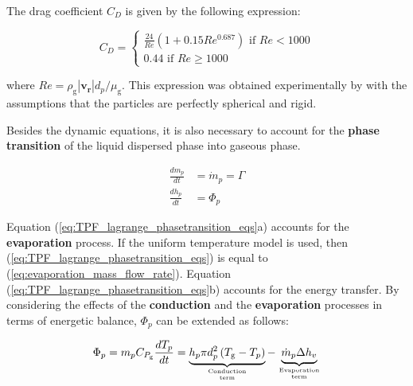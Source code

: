 The drag coefficient $C_D$ is given by the following expression:

\begin{equation}
\label{eq:Re_CD_droplet}
C_D =
\left\{
    \begin{split}
     \frac{24}{Re} \left( 1 + 0.15 Re^{0.687} \right)\,\,\mathrm{if}\,\,Re < 1000 \\ 
    0.44\,\,\mathrm{if}\,\,Re \geq 1000 
    \end{split}
\right.
\end{equation}

where $Re = \rho_\mathrm{g} | \boldsymbol{v_r} | d_p / \mu_\mathrm{g} $. This expression was obtained experimentally by  with the assumptions that the particles are perfectly spherical and rigid.  



Besides the dynamic equations, it is also necessary to account for the \textbf{phase transition} of the liquid dispersed phase into gaseous phase. 

\begin{subequations}
\label{eq:TPF_lagrange_phasetransition_eqs}
\begin{align}
\frac{d m_p}{d t} &= \dot{m}_p = \Gamma \\
\frac{d h_p}{d t} &= \Phi_p
\end{align}
\end{subequations}

Equation (\ref{eq:TPF_lagrange_phasetransition_eqs}a) accounts for the \textbf{evaporation} process. If the uniform temperature model is used, then (\ref{eq:TPF_lagrange_phasetransition_eqs}) is equal to (\ref{eq:evaporation_mass_flow_rate}). Equation (\ref{eq:TPF_lagrange_phasetransition_eqs}b) accounts for the energy transfer. By considering the effects of the \textbf{conduction} and the \textbf{evaporation} processes in terms of energetic balance, $\Phi_p$ can be extended as follows:

\begin{equation}
\Phi_p = m_p C_{P_\mathrm{g}} \frac{d T_p}{d t} = \underbrace{ h_p \pi d_p^2 \left( T_\mathrm{g} - T_p \right) }_{\text{Conduction}\atop\text{term}} - \underbrace{ \dot{m}_p  \Delta h_v }_{\text{Evaporation}\atop\text{term}}
\end{equation}

